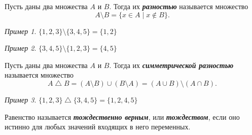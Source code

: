 \documentclass{article}
\theoremstyle{remark}
\newtheorem{example}{Пример}
\begin{document}
\begin{definition}
	Пусть даны два множества $A$ и $B$. Тогда их \textbf{\textit{разностью}} называется множество	
	$$A \setminus B =\{x\in A\mid x\not\in B\}.$$
\end{definition}

\begin{example}
	$\{1,2,3\} \setminus \{3,4,5\} = \{1,2\}$
\end{example}
\begin{example}
	$\{3,4,5\} \setminus \{1,2,3\} = \{4,5\}$
\end{example}

\begin{definition}
Пусть даны два множества $A$ и $B$. Тогда их \textbf{\textit{симметрической разностью}} называется множество
$$A \bigtriangleup B =\left( A \setminus B \right) \cup \left ( B \setminus A \right) = \left(A \cup B\right) \setminus \left(A \cap B\right).$$

\end{definition}

\begin{example}
$\{1,2,3\} \bigtriangleup \{3,4,5\} = \{1,2,4,5\}$
\end{example}

\begin{definition}
	Равенство называется \textit{\textbf{тождественно верным}}, или \textit{\textbf{тождеством}}, если оно истинно для любых значений входящих в него переменных.
\end{definition}
\end{document}
